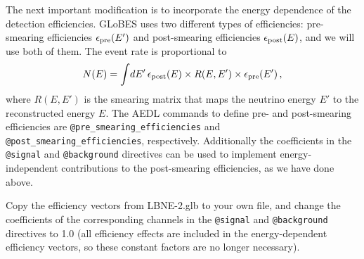 \documentclass[12pt,a4paper]{article}
\theoremstyle{dotless}
\begin{document}
The next important modification is to incorporate the energy dependence of the
detection efficiencies. GLoBES uses two different types of efficiencies:
pre-smearing efficiencies $\epsilon_{\rm pre}(E')$ and post-smearing efficiencies
$\epsilon_{\rm post}(E)$, and we will use both of them. The event rate is
proportional to
\begin{align}
  N(E) = \int\! dE' \, \epsilon_{\rm post}(E) \times R(E, E') \times
         \epsilon_{\rm pre}(E') \,,
\end{align}
where $R(E, E')$ is the smearing matrix that maps the neutrino energy $E'$ to
the reconstructed energy $E$. The AEDL commands to define pre- and
post-smearing efficiencies are {\tt @pre\_smearing\_efficiencies} and {\tt
@post\_smearing\_efficiencies}, respectively. Additionally the coefficients in
the {\tt @signal} and {\tt @background} directives can be used to implement
energy-independent contributions to the post-smearing efficiencies, as we have
done above. 
 
Copy the efficiency vectors from LBNE-2.glb to your own file, and change the
coefficients of the corresponding channels in the {\tt @signal} and
{\tt @background} directives to 1.0 (all efficiency effects are included in
the energy-dependent efficiency vectors, so these constant factors are
no longer necessary).
\end{document}
